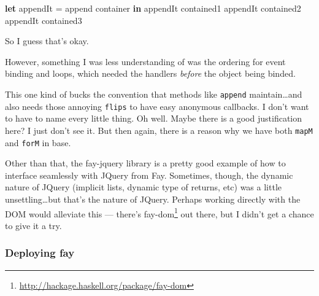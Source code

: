 \documentclass[]{article}
\newenvironment{Shaded}{}{}
\newcommand{\FunctionTok}[1]{\textcolor[rgb]{0.02,0.16,0.49}{#1}}
\newcommand{\KeywordTok}[1]{\textcolor[rgb]{0.00,0.44,0.13}{\textbf{#1}}}
\newcommand{\NormalTok}[1]{#1}
\newcommand{\OperatorTok}[1]{\textcolor[rgb]{0.40,0.40,0.40}{#1}}
\newcommand{\OtherTok}[1]{\textcolor[rgb]{0.00,0.44,0.13}{#1}}
\renewcommand{\href}[2]{#2\footnote{\url{#1}}}
\begin{document}
\begin{Shaded}
\begin{Highlighting}[]
\KeywordTok{let}
\NormalTok{  appendIt }\OtherTok{=}\NormalTok{ append container}
\KeywordTok{in}
\NormalTok{  appendIt contained1}
\NormalTok{  appendIt contained2}
\NormalTok{  appendIt contained3}
\end{Highlighting}
\end{Shaded}

So I guess that's okay.

However, something I was less understanding of was the ordering for event
binding and loops, which needed the handlers \emph{before} the object being
binded.

\begin{Shaded}
\end{Shaded}

This one kind of bucks the convention that methods like \texttt{append}
maintain\ldots and also needs those annoying \texttt{flips} to have easy
anonymous callbacks. I don't want to have to name every little thing. Oh well.
Maybe there is a good justification here? I just don't see it. But then again,
there is a reason why we have both \texttt{mapM} and \texttt{forM} in base.

Other than that, the fay-jquery library is a pretty good example of how to
interface seamlessly with JQuery from Fay. Sometimes, though, the dynamic nature
of JQuery (implicit lists, dynamic type of returns, etc) was a little
unsettling\ldots but that's the nature of JQuery. Perhaps working directly with
the DOM would alleviate this --- there's
\href{http://hackage.haskell.org/package/fay-dom}{fay-dom} out there, but I
didn't get a chance to give it a try.

\subsubsection{Deploying fay}\label{deploying-fay}
\end{document}
